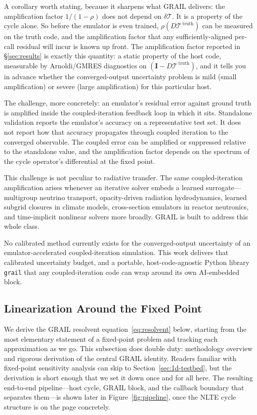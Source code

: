 \documentclass[11pt]{article}
\newcommand{\Tcyc}{\mathcal{T}}
\newcommand{\dT}{\delta\Tcyc}
\newcommand{\code}[1]{\texttt{#1}}
\begin{document}
A corollary worth stating, because it sharpens what GRAIL delivers:
the amplification factor $1/(1-\rho)$ does not depend on $\dT$.  It
is a property of the cycle alone.  So before the emulator is even
trained, $\rho(D\Tcyc^{\,\mathrm{truth}})$ can be measured on the
truth code, and the amplification factor that any sufficiently-aligned
per-call residual will incur is known up front.  The amplification
factor reported in §\ref{sec:results} is exactly this quantity: a
static property of the host code, measurable by
Arnoldi/GMRES diagnostics on $(\mathbf{I} - D\Tcyc^{\,\mathrm{truth}})$,
and it tells you in advance whether the converged-output uncertainty
problem is mild (small amplification) or severe (large amplification)
for this particular host.

The challenge, more concretely: an emulator's residual error against
ground truth is amplified inside the coupled-iteration feedback loop
in which it sits.  Standalone validation reports the emulator's
accuracy on a representative test set.  It does not report how that
accuracy propagates through coupled iteration to the converged
observable.  The coupled error can be amplified or suppressed
relative to the standalone value, and the amplification factor
depends on the spectrum of the cycle operator's differential at the
fixed point.

This challenge is not peculiar to radiative transfer.  The same
coupled-iteration amplification arises whenever an iterative solver
embeds a learned surrogate---multigroup neutrino transport,
opacity-driven radiation hydrodynamics, learned subgrid closures in
climate models, cross-section emulators in reactor neutronics, and
time-implicit nonlinear solvers more broadly.  GRAIL is built to
address this whole class.

No calibrated method currently exists for the converged-output
uncertainty of an emulator-accelerated coupled-iteration simulation.
This work delivers that calibrated uncertainty budget, and a
portable, host-code-agnostic Python library \code{grail} that any
coupled-iteration code can wrap around its own AI-embedded
block.

\subsection{Linearization Around the Fixed Point}
\label{sec:linearization}

We derive the GRAIL resolvent equation~\eqref{eq:resolvent} below,
starting from the most elementary statement of a fixed-point problem
and tracking each approximation as we go.  This subsection does double
duty: methodology overview and rigorous derivation of the central
GRAIL identity.  Readers familiar with fixed-point sensitivity
analysis can skip to Section~\ref{sec:1d-testbed}, but the derivation
is short enough that we set it down once and for all here.  The
resulting end-to-end pipeline---host cycle, GRAIL block, and the
callback boundary that separates them---is shown later in
Figure~\ref{fig:pipeline}, once the NLTE cycle structure is on the
page concretely.
\end{document}
